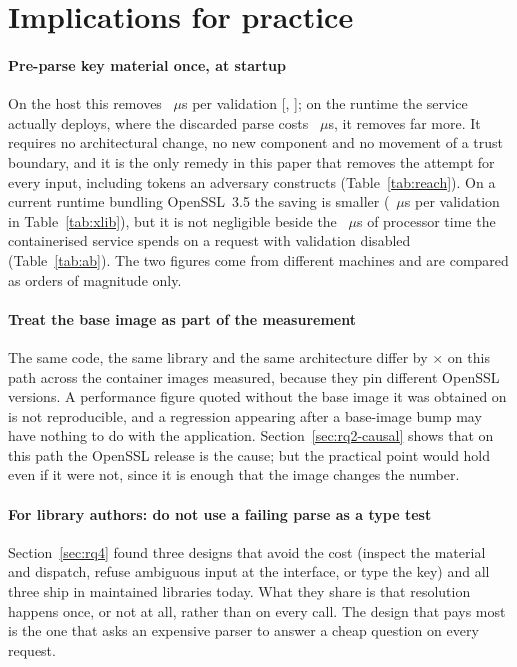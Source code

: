\documentclass[preprint,12pt,authoryear]{elsarticle}
\begin{document}
\section{Implications for practice}\label{sec:implications}

\paragraph{Pre-parse key material once, at startup} On the host this removes
\HostStringPenalty~$\mu$s per validation
[\HostStringPenaltyCiLo, \HostStringPenaltyCiHi]; on the runtime the service
actually deploys, where the discarded parse costs
\NodeEighteenProbeThrows~$\mu$s, it removes far more. It requires no
architectural change, no new component and no movement of a trust boundary,
and it is the only remedy in this paper that removes the attempt for every
input, including tokens an adversary constructs (Table~\ref{tab:reach}).
On a current runtime bundling OpenSSL~3.5 the saving is smaller (\XlibJsonwebtokenNewSslPenalty~$\mu$s per validation in Table~\ref{tab:xlib}),
but it is not negligible beside the \AbCpuPerCallNone~$\mu$s of processor time
the containerised service spends on a request with validation disabled
(Table~\ref{tab:ab}). The two figures come from different machines and are
compared as orders of magnitude only.

\paragraph{Treat the base image as part of the measurement} The same code, the
same library and the same architecture differ by \SpanProbeThrows$\times$ on this
path across the container images measured, because they pin different OpenSSL
versions. A performance figure quoted without the base image it was obtained on
is not reproducible, and a regression appearing after a base-image bump may have
nothing to do with the application. Section~\ref{sec:rq2-causal} shows that on
this path the OpenSSL release is the cause; but the practical point would hold
even if it were not, since it is enough that the image changes the number.

\paragraph{For library authors: do not use a failing parse as a type test}
Section~\ref{sec:rq4} found three designs that avoid the cost (inspect the
material and dispatch, refuse ambiguous input at the interface, or type the
key) and all three ship in maintained libraries today. What they share is
that resolution happens once, or not at all, rather than on every call. The
design that pays most is the one that asks an expensive parser to answer a cheap
question on every request.
\end{document}
